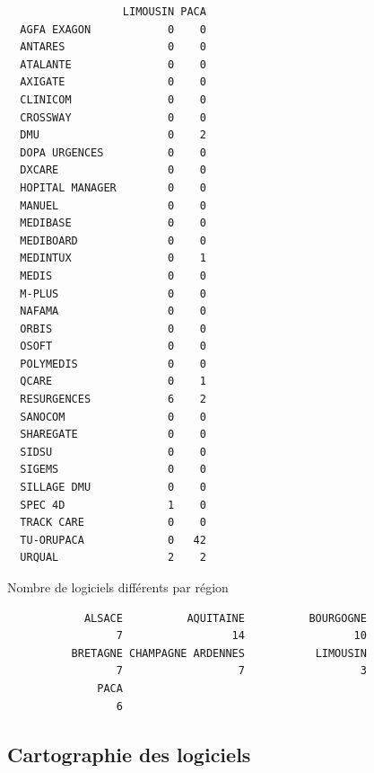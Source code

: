 \documentclass[]{article}
\begin{document}
\begin{verbatim}
                  LIMOUSIN PACA
  AGFA EXAGON            0    0
  ANTARES                0    0
  ATALANTE               0    0
  AXIGATE                0    0
  CLINICOM               0    0
  CROSSWAY               0    0
  DMU                    0    2
  DOPA URGENCES          0    0
  DXCARE                 0    0
  HOPITAL MANAGER        0    0
  MANUEL                 0    0
  MEDIBASE               0    0
  MEDIBOARD              0    0
  MEDINTUX               0    1
  MEDIS                  0    0
  M-PLUS                 0    0
  NAFAMA                 0    0
  ORBIS                  0    0
  OSOFT                  0    0
  POLYMEDIS              0    0
  QCARE                  0    1
  RESURGENCES            6    2
  SANOCOM                0    0
  SHAREGATE              0    0
  SIDSU                  0    0
  SIGEMS                 0    0
  SILLAGE DMU            0    0
  SPEC 4D                1    0
  TRACK CARE             0    0
  TU-ORUPACA             0   42
  URQUAL                 2    2
\end{verbatim}

Nombre de logiciels différents par région

\begin{verbatim}
            ALSACE          AQUITAINE          BOURGOGNE 
                 7                 14                 10 
          BRETAGNE CHAMPAGNE ARDENNES           LIMOUSIN 
                 7                  7                  3 
              PACA 
                 6 
\end{verbatim}

\subsection{Cartographie des
logiciels}\label{cartographie-des-logiciels}
\end{document}
